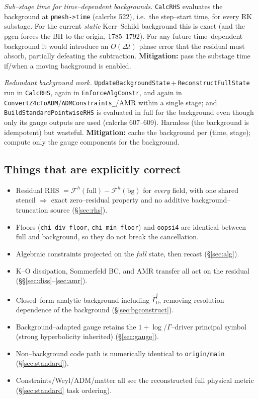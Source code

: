 \documentclass[11pt]{article}
\newcommand{\code}[1]{\texttt{#1}}
\newcommand{\file}[1]{\texttt{#1}}
\newcommand{\Gamt}{\tilde\Gamma}
\newcommand{\bg}[1]{#1_{0}}
\newcommand{\Fop}{\mathcal{F}}            %
\newcommand{\Fnum}{\Fop^{h}}              %
\begin{document}
\begin{description}[leftmargin=2.2em,style=unboxed,itemsep=4pt]
\item[R6 \sev{Latent / Low}] \emph{Sub--stage time for time--dependent
backgrounds.} \code{CalcRHS} evaluates the background at
\code{pmesh->time} (calcrhs 522), i.e.\ the step--start time, for every RK
substage. For the current \emph{static} Kerr--Schild background this is exact
(and the pgen forces the BH to the origin, 1785--1792). For any future
time--dependent background it would introduce an $O(\Delta t)$ phase error that
the residual must absorb, partially defeating the subtraction.
\textbf{Mitigation:} pass the substage time if/when a moving background is
enabled.

\item[R7 \sev{Performance / Cosmetic}] \emph{Redundant background work.}
\code{UpdateBackgroundState}\,+\,\code{ReconstructFullState} run in
\code{CalcRHS}, again in \code{EnforceAlgConstr}, and again in
\code{ConvertZ4cToADM}/\code{ADMConstraints\_}/AMR within a single stage; and
\code{BuildStandardPointwiseRHS} is evaluated in full for the background even
though only its gauge outputs are used (calcrhs 607--609). Harmless (the
background is idempotent) but wasteful. \textbf{Mitigation:} cache the
background per (time, stage); compute only the gauge components for the
background.

\end{description}

\subsection*{Things that are explicitly correct}
\begin{itemize}[leftmargin=1.4em,itemsep=1pt]
\item Residual RHS $=\Fnum(\text{full})-\Fnum(\text{bg})$ for \emph{every}
field, with one shared stencil $\Rightarrow$ exact zero--residual property and
no additive background--truncation source (\S\ref{sec:rhs}).
\item Floors (\code{chi\_div\_floor}, \code{chi\_min\_floor}) and \code{oopsi4}
are identical between full and background, so they do not break the
cancellation.
\item Algebraic constraints projected on the \emph{full} state, then recast
(\S\ref{sec:alg}).
\item K--O dissipation, Sommerfeld BC, and AMR transfer all act on the
residual (\S\S\ref{sec:diss}--\ref{sec:amr}).
\item Closed--form analytic background including $\bg{\Gamt}^i$, removing
resolution dependence of the background (\S\ref{sec:bgconstruct}).
\item Background--adapted gauge retains the $1+\log$/$\Gamma$--driver principal
symbol (strong hyperbolicity inherited) (\S\ref{sec:gauge}).
\item Non--background code path is numerically identical to \file{origin/main}
(\S\ref{sec:standard}).
\item Constraints/Weyl/ADM/matter all see the reconstructed full physical
metric (\S\ref{sec:standard} task ordering).
\end{itemize}
\end{document}
